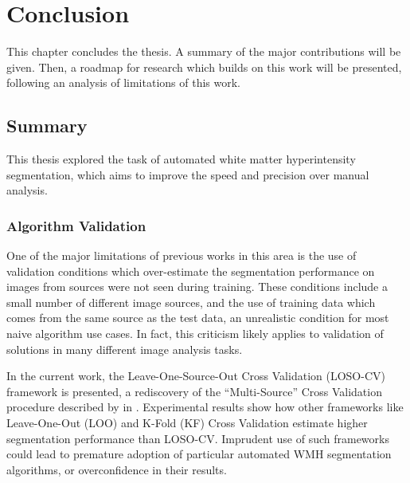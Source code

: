 \chapter{Conclusion}\label{ch-conc}
This chapter concludes the thesis.
A summary of the major contributions will be given.
Then, a roadmap for research which builds on this work will be presented,
following an analysis of limitations of this work.
\section{Summary}
This thesis explored the task of automated white matter hyperintensity segmentation,
which aims to improve the speed and precision over manual analysis.
\subsection{Algorithm Validation}
One of the major limitations of previous works in this area
is the use of validation conditions which over-estimate
the segmentation performance on images from sources
were not seen during training.
These conditions include a small number of different image sources,
and the use of training data which comes from the same source as the test data,
an unrealistic condition for most naive algorithm use cases.
In fact, this criticism likely applies to
validation of solutions in many different image analysis tasks.
\par
In the current work, the Leave-One-Source-Out Cross Validation (LOSO-CV) framework is presented,
a rediscovery of the ``Multi-Source'' Cross Validation procedure
described by \citeauthor{Geras2013} in \cite{Geras2013}.
Experimental results show how other frameworks like
Leave-One-Out (LOO) and K-Fold (KF) Cross Validation
estimate higher segmentation performance than LOSO-CV.
Imprudent use of such frameworks could lead to
premature adoption of particular automated WMH segmentation algorithms,
or overconfidence in their results.
